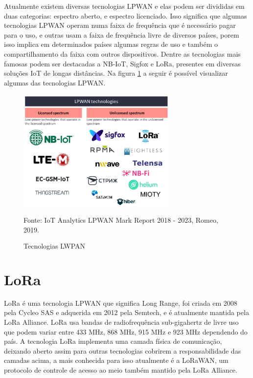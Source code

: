 Atualmente existem diversas tecnologias LPWAN e elas podem ser divididas em duas categorias: espectro
aberto, e espectro licenciado. Isso significa que algumas tecnologias LPWAN operam numa faixa de frequência que é necessário pagar para o uso, e outras usam a faixa de frequência livre de diversos
países, porem isso implica em determinados países algumas regras de uso e também o compartilhamento
da faixa com outros dispositivos. Dentre as tecnologias mais famosas podem ser destacadas a NB-IoT,
Sigfox e LoRa, presentes em diversas soluções IoT de longas distâncias. Na figura \ref{fig:lpwans}
a seguir é possível visualizar algumas das tecnologias LPWAN. \cite{fi12030046}

\begin{figure}[H]
    \centering
	\caption{Tecnologias LWPAN}
    \includegraphics[width=0.7\textwidth]{img/lpwans.png}
    \label{fig:lpwans}
    
    Fonte: IoT Analytics LPWAN Mark Report 2018 - 2023, Romeo, 2019.
\end{figure}

\section{LoRa}

LoRa é uma tecnologia LPWAN que significa Long Range, foi criada em 2008 pela Cycleo SAS e adquerida
em 2012 pela Semtech, e é atualmente mantida pela LoRa Alliance. LoRa usa bandas de radiofrequência
sub-gigahertz de livre uso que podem variar entre 433 MHz, 868 MHz, 915 MHz e 923 MHz dependendo do
país. A tecnologia LoRa implementa uma camada física de comunicação, deixando aberto assim para outras
tecnologias cobrirem a responsabilidade das camadas acima, a mais conhecida para isso atualmente é a LoRaWAN, um protocolo de controle de acesso ao meio também mantido pela LoRa Alliance.  \cite{8474715}

